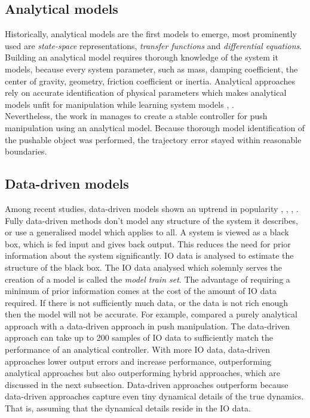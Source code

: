 \subsection{Analytical models}
\label{subsection: analytical_models}
Historically, analytical models are the first models to emerge, most prominently used are \textit{state-space} representations, \textit{transfer functions} and \textit{differential equations}. Building an analytical model requires thorough knowledge of the system it models, because every system parameter, such as mass, damping coefficient, the center of gravity, geometry, friction coefficient or inertia. Analytical approaches rely on accurate identification of physical parameters which makes analytical models unfit for manipulation while learning system models \cite{arruda_uncertainty_2017}, \cite{stuber_feature-based_2018}.\\

Nevertheless, the work in \cite{bauza_data-efficient_2018} manages to create a stable controller for push manipulation using an analytical model. Because thorough model identification of the pushable object was performed, the trajectory error stayed within reasonable boundaries. 

\subsection{Data-driven models}
\label{subsection: data_driven_models}
Among recent studies, data-driven models shown an uptrend in popularity \cite{mericli_push-manipulation_2015},
\cite{bauza_data-efficient_2018},  \cite{stuber_feature-based_2018}, \cite{stuber_lets_2020}. Fully data-driven methods don't model any structure of the system it describes, or use a generalised model which applies to all. A system is viewed as a black box, which is fed input and gives back output. This reduces the need for prior information about the system significantly. \ac{IO} data is analysed to estimate the structure of the black box. The \ac{IO} data analysed which solemnly serves the creation of a model is called the \textit{model train set}. The advantage of requiring a minimum of prior information comes at the cost of the amount of \ac{IO} data required. If there is not sufficiently much data, or the data is not rich enough then the model will not be accurate. For example, \cite{bauza_data-efficient_2018} compared a purely analytical approach with a data-driven approach in push manipulation. The data-driven approach can take up to 200 samples of \ac{IO} data to sufficiently match the performance of an analytical controller. With more \ac{IO} data, data-driven approaches lower output errors and increase performance, outperforming analytical approaches but also outperforming hybrid approaches, which are discussed in the next subsection. Data-driven approaches outperform because data-driven approaches capture even tiny dynamical details of the true dynamics. That is, assuming that the dynamical details reside in the \ac{IO} data. \\

